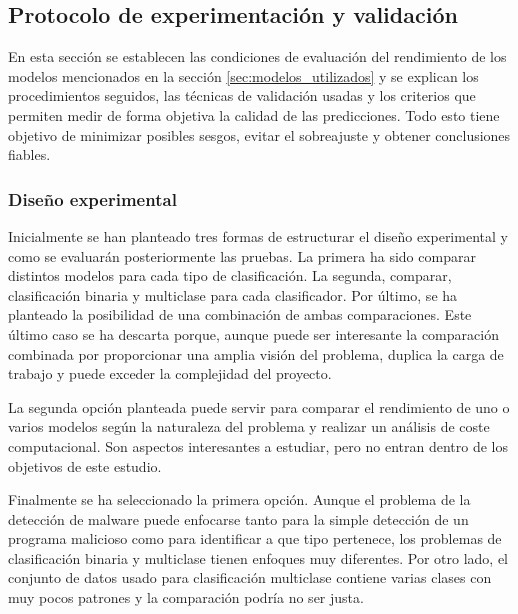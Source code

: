 \subsection{Protocolo de experimentación y validación}
\label{subsec:protocolo_exper}

En esta sección se establecen las condiciones de evaluación del rendimiento de los modelos mencionados en la sección \ref{sec:modelos_utilizados} y se explican los procedimientos seguidos, las técnicas de validación usadas y los criterios que permiten medir de forma objetiva la calidad de las predicciones. Todo esto tiene objetivo de minimizar posibles sesgos, evitar el sobreajuste y obtener conclusiones fiables.

\subsubsection{Diseño experimental}
\label{subsubsec:diseño}

Inicialmente se han planteado tres formas de estructurar el diseño experimental y como se evaluarán posteriormente las pruebas. La primera ha sido comparar distintos modelos para cada tipo de clasificación. La segunda, comparar, clasificación binaria y multiclase para cada clasificador. Por último, se ha planteado la posibilidad de una combinación de ambas comparaciones. Este último caso se ha descarta porque, aunque puede ser interesante la comparación combinada por proporcionar una amplia visión del problema, duplica la carga de trabajo y puede exceder la complejidad del proyecto.

\vspace{1em}

La segunda opción planteada puede servir para comparar el rendimiento de uno o varios modelos según la naturaleza del problema y realizar un análisis de coste computacional. Son aspectos interesantes a estudiar, pero no entran dentro de los objetivos de este estudio.

\vspace{1em}

Finalmente se ha seleccionado la primera opción. Aunque el problema de la detección de malware puede enfocarse tanto para la simple detección de un programa malicioso como para identificar a que tipo pertenece, los problemas de clasificación binaria y multiclase tienen enfoques muy diferentes. Por otro lado, el conjunto de datos usado para clasificación multiclase contiene varias clases con muy pocos patrones y la comparación podría no ser justa.

